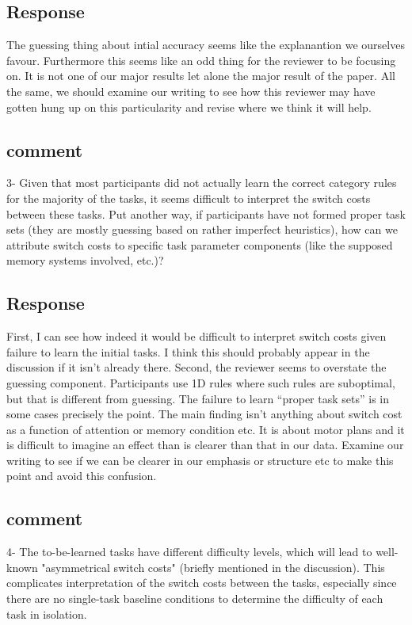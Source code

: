 \subsection{Response}
The guessing thing about intial accuracy seems like the
explanantion we ourselves favour. Furthermore this seems
like an odd thing for the reviewer to be focusing on. It is
not one of our major results let alone the major result of
the paper. All the same, we should examine our writing to
see how this reviewer may have gotten hung up on this
particularity and revise where we think it will help.

\subsection{comment}
3- Given that most participants did not actually learn the
correct category rules for the majority of the tasks, it
seems difficult to interpret the switch costs between these
tasks. Put another way, if participants have not formed
proper task sets (they are mostly guessing based on rather
imperfect heuristics), how can we attribute switch costs to
specific task parameter components (like the supposed memory
systems involved, etc.)?

\subsection{Response}
First, I can see how indeed it would be difficult to
interpret switch costs given failure to learn the initial
tasks. I think this should probably appear in the discussion
if it isn't already there. Second, the reviewer seems to
overstate the guessing component. Participants use 1D rules
where such rules are suboptimal, but that is different from
guessing. The failure to learn ``proper task sets'' is in
some cases precisely the point. The main finding isn't
anything about switch cost as a function of attention or
memory condition etc. It is about motor plans and it is
difficult to imagine an effect than is clearer than that in
our data.  Examine our writing to see if we can be clearer
in our emphasis or structure etc to make this point and
avoid this confusion.

\subsection{comment}
4- The to-be-learned tasks have different difficulty levels,
which will lead to well-known "asymmetrical switch costs"
(briefly mentioned in the discussion). This complicates
interpretation of the switch costs between the tasks,
especially since there are no single-task baseline
conditions to determine the difficulty of each task in
isolation.

